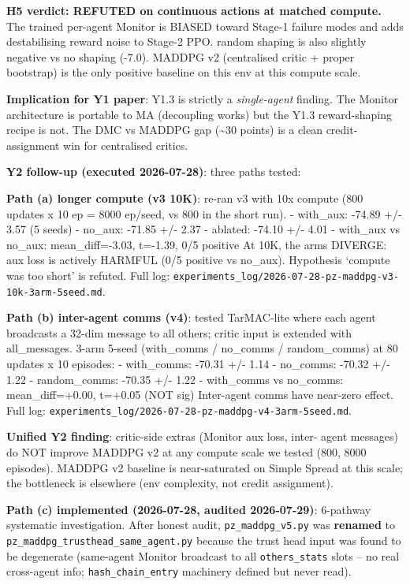 \documentclass[
]{article}
\begin{document}
\textbf{H5 verdict: REFUTED on continuous actions at matched compute.}
The trained per-agent Monitor is BIASED toward Stage-1 failure modes and
adds destabilising reward noise to Stage-2 PPO. random shaping is also
slightly negative vs no shaping (-7.0). MADDPG v2 (centralised critic +
proper bootstrap) is the only positive baseline on this env at this
compute scale.

\textbf{Implication for Y1 paper}: Y1.3 is strictly a
\emph{single-agent} finding. The Monitor architecture is portable to MA
(decoupling works) but the Y1.3 reward-shaping recipe is not. The DMC vs
MADDPG gap (\textasciitilde30 points) is a clean credit-assignment win
for centralised critics.

\textbf{Y2 follow-up (executed 2026-07-28)}: three paths tested:

\textbf{Path (a) longer compute (v3 10K)}: re-ran v3 with 10x compute
(800 updates x 10 ep = 8000 ep/seed, vs 800 in the short run). -
with\_aux: -74.89 +/- 3.57 (5 seeds) - no\_aux: -71.85 +/- 2.37 -
ablated: -74.10 +/- 4.01 - with\_aux vs no\_aux: mean\_diff=-3.03,
t=-1.39, 0/5 positive At 10K, the arms DIVERGE: aux loss is actively
HARMFUL (0/5 positive vs no\_aux). Hypothesis `compute was too short' is
refuted. Full log:
\texttt{experiments\_log/2026-07-28-pz-maddpg-v3-10k-3arm-5seed.md}.

\textbf{Path (b) inter-agent comms (v4)}: tested TarMAC-lite where each
agent broadcasts a 32-dim message to all others; critic input is
extended with all\_messages. 3-arm 5-seed (with\_comms / no\_comms /
random\_comms) at 80 updates x 10 episodes: - with\_comms: -70.31 +/-
1.14 - no\_comms: -70.32 +/- 1.22 - random\_comms: -70.35 +/- 1.22 -
with\_comms vs no\_comms: mean\_diff=+0.00, t=+0.05 (NOT sig)
Inter-agent comms have near-zero effect. Full log:
\texttt{experiments\_log/2026-07-28-pz-maddpg-v4-3arm-5seed.md}.

\textbf{Unified Y2 finding}: critic-side extras (Monitor aux loss,
inter- agent messages) do NOT improve MADDPG v2 at any compute scale we
tested (800, 8000 episodes). MADDPG v2 baseline is near-saturated on
Simple Spread at this scale; the bottleneck is elsewhere (env
complexity, not credit assignment).

\textbf{Path (c) implemented (2026-07-28, audited 2026-07-29)}:
6-pathway systematic investigation. After honest audit,
\texttt{pz\_maddpg\_v5.py} was \textbf{renamed} to
\texttt{pz\_maddpg\_trusthead\_same\_agent.py} because the trust head
input was found to be degenerate (same-agent Monitor broadcast to all
\texttt{others\_stats} slots -- no real cross-agent info;
\texttt{hash\_chain\_entry} machinery defined but never read).
\end{document}
